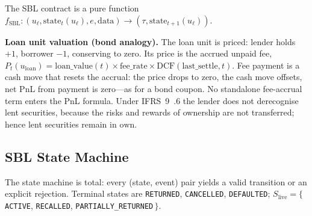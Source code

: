 \documentclass[11pt,a4paper]{article}
\begin{document}
\noindent The SBL contract is a pure function $f_{\mathrm{SBL}}:(u_\ell,\mathrm{state}_t(u_\ell),e,\mathrm{data}) \to (\tau,\mathrm{state}_{t+1}(u_\ell))$.

\noindent\textbf{Loan unit valuation (bond analogy).} The loan unit is priced: lender holds $+1$, borrower $-1$, conserving to zero. Its price is the accrued unpaid fee, $P_t(u_{\mathrm{loan}}) = \mathrm{loan\_value}(t)\times\mathrm{fee\_rate}\times\mathrm{DCF}(\mathrm{last\_settle},t)$. Fee payment is a cash move that resets the accrual: the price drops to zero, the cash move offsets, net PnL from payment is zero---as for a bond coupon. No standalone fee-accrual term enters the PnL formula. Under IFRS~9~.6 the lender does not derecognise lent securities, because the risks and rewards of ownership are not transferred; hence lent securities remain in $\mathrm{own}$.

\subsection{SBL State Machine}
\label{sec:sbl-state-machine}

The state machine is total: every (state, event) pair yields a valid transition or an explicit rejection. Terminal states are \texttt{RETURNED}, \texttt{CANCELLED}, \texttt{DEFAULTED}; $S_{\mathrm{live}} = \{\,$\texttt{ACTIVE}, \texttt{RECALLED}, \texttt{PARTIALLY\_RETURNED}$\,\}$.
\end{document}
